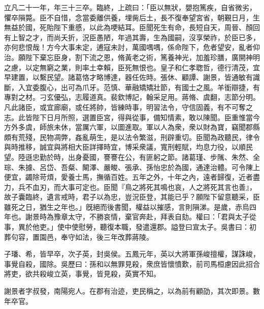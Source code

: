 \begin{pinyinscope}
立凡二十一年，年三十三卒。臨終，上疏曰：「臣以無狀，嬰抱篤疾，自省微劣，懼卒隕斃。臣不自惜，念當委離供養，埋胔后土，長不復奉望宮省，朝覲日月，生無益於國，死貽陛下重慼，以此為哽結耳。臣聞死生有命，長短自天，周晉、顏回有上智之才，而尚夭折，況臣愚陋，年過其壽，生為國嗣，沒享榮祚，於臣已多，亦何悲恨哉！方今大事未定，逋寇未討，萬國喁喁，係命陛下，危者望安，亂者仰治。願陛下棄忘臣身，割下流之恩，脩黃老之術，篤養神光，加羞珍膳，廣開神明之慮，以定無窮之業，則率土幸賴，臣死無恨也。皇子和仁孝聦哲，德行清茂，宜早建置，以繫民望。諸葛恪才略博達，器任佐時。張休、顧譚、謝景，皆通敏有識斷，入宜委腹心，出可為爪牙。范慎、華融矯矯壯節，有國士之風。羊衜辯捷，有專對之材。刁玄優弘，志履道真。裴欽博記，翰采足用。蔣脩、虞翻，志節分明。凡此諸臣，或宜廊廟，或任將帥，皆練時事，明習法令，守信固義，有不可奪之志。此皆陛下日月所照，選置臣宮，得與從事，備知情素，敢以陳聞。臣重惟當今方外多虞，師旅未休，當厲六軍，以圖進取。軍以人為衆，衆以財為寶，竊聞郡縣頗有荒殘，民物凋弊，姦亂萌生，是以法令繁滋，刑辟重切。臣聞為政聽民，律令與時推移，誠宜與將相大臣詳擇時宜，博采衆議，寬刑輕賦，均息力役，以順民望。陸遜忠勤於時，出身憂國，謇謇在公，有匪躬之節。諸葛瑾、步隲、朱然、全琮、朱據、呂岱、吾粲、闞澤、嚴畯、張承、孫怡忠於為國，通達治體。可令陳上便宜，蠲除苛煩，愛養士馬，撫循百姓。五年之外，十年之內，遠者歸復，近者盡力，兵不血刃，而大事可定也。臣聞『鳥之將死其鳴也哀，人之將死其言也善』，故子囊臨終，遺言戒時，君子以為忠，豈況臣登，其能已乎？願陛下留意聽采，臣雖死之日，猶生之年也。」旣絕而後書聞，權益以摧感，言則隕涕。是歲，赤烏四年也。謝景時為豫章太守，不勝哀情，棄官奔赴，拜表自劾。權曰：「君與太子從事，異於他吏。」使中使慰勞，聽復本職，發遣還郡。謚登曰宣太子。吳書曰：初葬句容，置園邑，奉守如法，後三年改葬蔣陵。

子璠、希，皆早卒，次子英，封吳侯。五鳳元年，英以大將軍孫峻擅權，謀誅峻，事覺自殺，國除。吳歷曰：孫和以無罪見殺，衆庶皆懷憤歎，前司馬桓慮因此招合將吏，欲共殺峻立英，事覺，皆見殺，英實不知。

謝景者字叔發，南陽宛人。在郡有治迹，吏民稱之，以為前有顧劭，其次即景。數年卒官。


\end{pinyinscope}